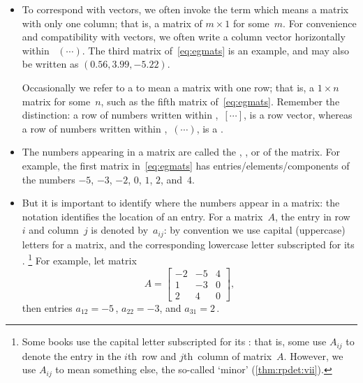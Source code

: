 \begin{itemize}
\item To correspond with vectors,  we often invoke the term  which means a matrix with only one column; that is, a matrix of  \(m\times 1\) for some~\(m\).
For convenience and compatibility with vectors, we often write a column vector horizontally within ~\((\cdots )\).
The third matrix of~\eqref{eq:egmats} is an example, and may also be written as \((0.56,3.99,-5.22)\).

Occasionally we refer to a  to mean a matrix with one row; that is, a \(1\times n\) matrix for some~\(n\), such as the fifth matrix of~\eqref{eq:egmats}.  
Remember the distinction: a row of numbers written within ,~\([\cdots]\), is a row vector, whereas a row of numbers written within ,~\((\cdots)\), is a .

\item The numbers appearing in a matrix are called the , , or  of the matrix.  
For example, the first matrix in~\eqref{eq:egmats} has entries\slash elements\slash components of the numbers \(-5\), \(-3\), \(-2\), \(0\), \(1\), \(2\), and~\(4\).

\item But it is important to identify where the numbers appear in a matrix:  the  notation identifies the location of an entry.
For a matrix~\(A\), the entry in row~\(i\) and column~\(j\) is denoted by~\(a_{ij}\):
by convention we use capital (uppercase) letters for a matrix, and the corresponding lowercase letter subscripted for its .%
\footnote{Some books use the capital letter subscripted for its : that is, some use \(A_{ij}\) to denote the entry in the \(i\)th~row and \(j\)th~column of matrix~\(A\).  
However, we use \(A_{ij}\) to mean something else, the so-called `minor' (\cref{thm:rpdet:vii}).}
For example, let matrix
\begin{equation*}
A=\begin{bmatrix}   -2 & -5 & 4
\\ 1 & -3 & 0
\\ 2 & 4 & 0 \end{bmatrix},
\end{equation*}
then entries \(a_{12}=-5\)\,, \(a_{22}=-3\), and \(a_{31}=2\)\,.

\end{itemize}
